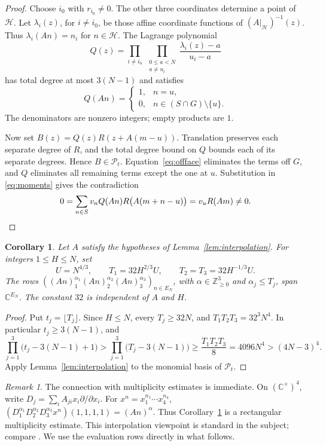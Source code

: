 \documentclass[11pt,a4paper]{amsart}
\newtheorem{corollary}[theorem]{Corollary}
\theoremstyle{remark}
\newtheorem{remark}[theorem]{Remark}
\newcommand{\C}{\mathbb C}
\newcommand{\N}{\mathbb Z_{\ge0}}
\newcommand{\cP}{\mathcal P}
\numberwithin{equation}{section}
\begin{document}
\begin{proof}
Choose $i_0$ with $r_{i_0}\ne0$. The other three coordinates
determine a point of $\mathcal H$. Let $\lambda_i(z)$, for
$i\ne i_0$, be those affine coordinate functions of
$(A|_{\mathcal H})^{-1}(z)$. Thus $\lambda_i(An)=n_i$ for
$n\in\mathcal H$. The Lagrange polynomial
\[
 Q(z)=\prod_{i\ne i_0}\ \prod_{\substack{0\le a<N\\a\ne u_i}}
             \frac{\lambda_i(z)-a}{u_i-a}
\]
has total degree at most $3(N-1)$ and satisfies
\[
 Q(An)=\begin{cases}1,&n=u,\\0,&n\in(S\cap G)\setminus\{u\}.
 \end{cases}
\]
The denominators are nonzero integers; empty products are $1$.

Now set $B(z)=Q(z)R(z+A(m-u))$. Translation preserves each separate
degree of $R$, and the total degree bound on $Q$ bounds each of its
separate degrees. Hence $B\in\cP_t$. Equation~\eqref{eq:offface}
eliminates the terms off $G$, and $Q$ eliminates all remaining terms
except the one at $u$. Substitution in \eqref{eq:moments} gives
the contradiction
\[
 0=\sum_{n\in S}v_nQ(An)R\bigl(A(m+n-u)\bigr)
   =v_uR(Am)\ne0.\qedhere
\]
\end{proof}

\begin{corollary}\label{cor:rectangle}
Let $A$ satisfy the hypotheses of Lemma~\ref{lem:interpolation}.
For integers $1\le H\le N$, set
\[
 U=N^{4/3},\qquad T_1=32H^{2/3}U,
 \qquad T_2=T_3=32H^{-1/3}U.
\]
The rows $((An)_1^{\alpha_1}(An)_2^{\alpha_2}(An)_3^{\alpha_3})_{n\in E_N}$,
with $\alpha\in\N^3$ and $\alpha_j\le T_j$, span $\C^{E_N}$.
The constant $32$ is independent of $A$ and $H$.
\end{corollary}

\begin{proof}
Put $t_j=\lfloor T_j\rfloor$. Since $H\le N$, every $T_j\ge32N$,
and $T_1T_2T_3=32^3N^4$. In particular $t_j\ge3(N-1)$, and
\[
 \prod_{j=1}^3\bigl(t_j-3(N-1)+1\bigr)
 >\prod_{j=1}^3\bigl(T_j-3(N-1)\bigr)
 \ge\frac{T_1T_2T_3}{8}
 =4096N^4>(4N-3)^4.
\]
Apply Lemma~\ref{lem:interpolation} to the monomial basis of $\cP_t$.
\end{proof}

\begin{remark}
The connection with multiplicity estimates is immediate. On
$(\C^\times)^4$, write $D_j=\sum_i A_{ji}x_i\partial/\partial x_i$.
For $x^n=x_1^{n_1}\cdots x_4^{n_4}$,
$(D_1^{\alpha_1}D_2^{\alpha_2}D_3^{\alpha_3}x^n)(1,1,1,1)=(An)^\alpha$.
Thus Corollary~\ref{cor:rectangle} is a rectangular multiplicity
estimate. This interpolation viewpoint is standard in the subject;
compare \cite[Section~1]{Fischler}. We use the evaluation rows
directly in what follows.
\end{remark}
\end{document}
